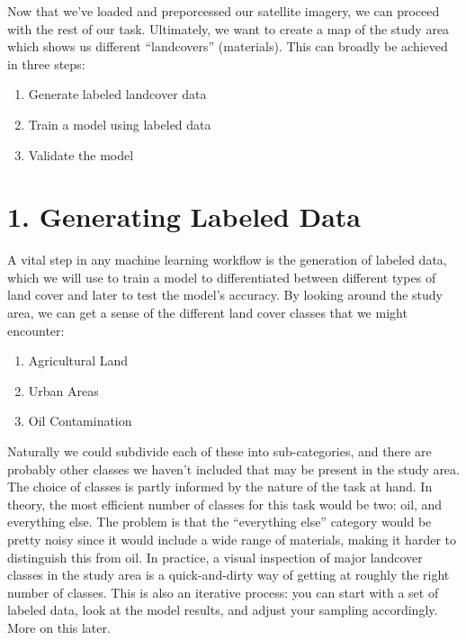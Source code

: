 \documentclass[
  letterpaper,
  DIV=11,
  numbers=noendperiod]{scrreprt}
\providecommand{\tightlist}{%
  \setlength{\itemsep}{0pt}\setlength{\parskip}{0pt}}\usepackage{longtable,booktabs,array}
\begin{document}
Now that we've loaded and preporcessed our satellite imagery, we can
proceed with the rest of our task. Ultimately, we want to create a map
of the study area which shows us different ``landcovers'' (materials).
This can broadly be achieved in three steps:

\begin{enumerate}
\def\labelenumi{\arabic{enumi}.}
\tightlist
\item
  Generate labeled landcover data
\item
  Train a model using labeled data
\item
  Validate the model
\end{enumerate}

\hypertarget{generating-labeled-data}{%
\section*{1. Generating Labeled Data}\label{generating-labeled-data}}


A vital step in any machine learning workflow is the generation of
labeled data, which we will use to train a model to differentiated
between different types of land cover and later to test the model's
accuracy. By looking around the study area, we can get a sense of the
different land cover classes that we might encounter:

\begin{enumerate}
\def\labelenumi{\arabic{enumi}.}
\tightlist
\item
  Agricultural Land
\item
  Urban Areas
\item
  Oil Contamination
\end{enumerate}

Naturally we could subdivide each of these into sub-categories, and
there are probably other classes we haven't included that may be present
in the study area. The choice of classes is partly informed by the
nature of the task at hand. In theory, the most efficient number of
classes for this task would be two: oil, and everything else. The
problem is that the ``everything else'' category would be pretty noisy
since it would include a wide range of materials, making it harder to
distinguish this from oil. In practice, a visual inspection of major
landcover classes in the study area is a quick-and-dirty way of getting
at roughly the right number of classes. This is also an iterative
process: you can start with a set of labeled data, look at the model
results, and adjust your sampling accordingly. More on this later.
\end{document}
